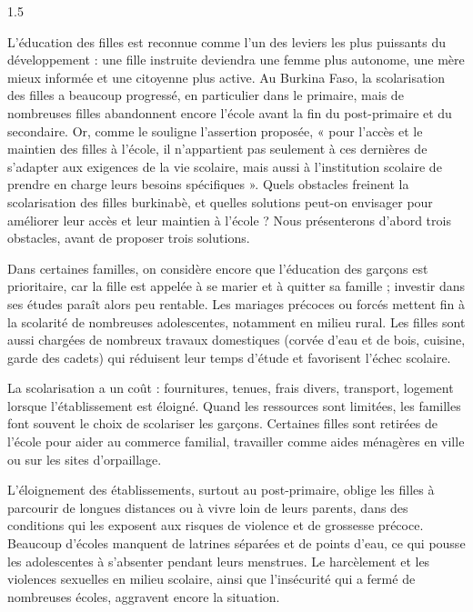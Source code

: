 \documentclass[12pt]{article}
\begin{document}
\begin{spacing}{1.5}


L'éducation des filles est reconnue comme l'un des leviers les plus puissants du développement : une fille instruite deviendra une femme plus autonome, une mère mieux informée et une citoyenne plus active. Au Burkina Faso, la scolarisation des filles a beaucoup progressé, en particulier dans le primaire, mais de nombreuses filles abandonnent encore l'école avant la fin du post-primaire et du secondaire. Or, comme le souligne l'assertion proposée, « pour l'accès et le maintien des filles à l'école, il n'appartient pas seulement à ces dernières de s'adapter aux exigences de la vie scolaire, mais aussi à l'institution scolaire de prendre en charge leurs besoins spécifiques ». Quels obstacles freinent la scolarisation des filles burkinabè, et quelles solutions peut-on envisager pour améliorer leur accès et leur maintien à l'école ? Nous présenterons d'abord trois obstacles, avant de proposer trois solutions.


Dans certaines familles, on considère encore que l'éducation des garçons est prioritaire, car la fille est appelée à se marier et à quitter sa famille ; investir dans ses études paraît alors peu rentable. Les mariages précoces ou forcés mettent fin à la scolarité de nombreuses adolescentes, notamment en milieu rural. Les filles sont aussi chargées de nombreux travaux domestiques (corvée d'eau et de bois, cuisine, garde des cadets) qui réduisent leur temps d'étude et favorisent l'échec scolaire.

La scolarisation a un coût : fournitures, tenues, frais divers, transport, logement lorsque l'établissement est éloigné. Quand les ressources sont limitées, les familles font souvent le choix de scolariser les garçons. Certaines filles sont retirées de l'école pour aider au commerce familial, travailler comme aides ménagères en ville ou sur les sites d'orpaillage.

L'éloignement des établissements, surtout au post-primaire, oblige les filles à parcourir de longues distances ou à vivre loin de leurs parents, dans des conditions qui les exposent aux risques de violence et de grossesse précoce. Beaucoup d'écoles manquent de latrines séparées et de points d'eau, ce qui pousse les adolescentes à s'absenter pendant leurs menstrues. Le harcèlement et les violences sexuelles en milieu scolaire, ainsi que l'insécurité qui a fermé de nombreuses écoles, aggravent encore la situation.


\end{spacing}
\end{document}
